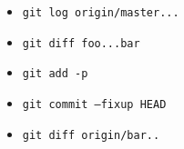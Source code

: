 \documentclass{beamer}
\begin{document}
\begin{frame}
  \begin{itemize}
  \item \texttt{git log origin/master...}
  \item \texttt{git diff foo...bar}
  \item \texttt{git add -p}
  \item \texttt{git commit --fixup HEAD~~}
  \item \texttt{git diff origin/bar..}
  \end{itemize}
\end{frame}

\begin{frame}
  \titlepage
\end{frame}

\begin{frame}
  \titlepage
\end{frame}
\end{document}
